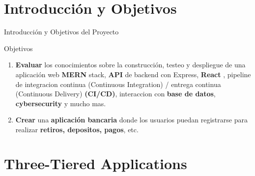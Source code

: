 \documentclass[xcolor=pdftex,dvipsnames,table]{beamer}
\begin{document}
\section{Introducción y Objetivos}
\begin{frame}{Introducción y Objetivos del Proyecto}
        \justifying
        \small
        \begin{block}{Objetivos}
            \justifying
            \begin{enumerate}
                \justifying
                \item {\textbf{Evaluar} los conocimientos sobre la construcción, testeo y despliegue de una aplicación web \textbf{MERN} stack, \textbf{API} de backend con Express, \textbf{React} , pipeline de integracion continua (Continuous Integration) / entrega continua (Continuous Delivery) \textbf{(CI/CD)}, interaccion con \textbf{base de datos}, \textbf{cybersecurity}  y mucho mas.}
                \item {\textbf{Crear} una  \textbf{aplicación bancaria} donde los usuarios puedan registrarse para realizar  \textbf{retiros, depositos, pagos}, etc.}
            \end{enumerate}
            
        \end{block}	
\end{frame}

\section{Three-Tiered Applications}
\end{document}
